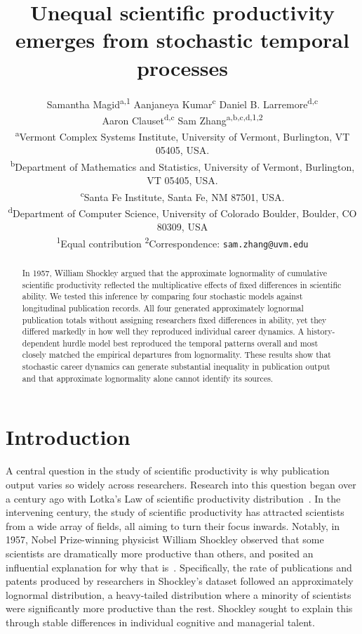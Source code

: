 \documentclass{article}
\title{Unequal scientific productivity emerges from stochastic temporal processes}
\author{%
    Samantha Magid\textsuperscript{a,1} \quad
    Aanjaneya Kumar\textsuperscript{c} \quad
    Daniel B. Larremore\textsuperscript{d,c} \\
    Aaron Clauset\textsuperscript{d,c} \quad
    Sam Zhang\textsuperscript{a,b,c,d,1,2} \\[0.5em]
    \small\textsuperscript{a}Vermont Complex Systems Institute, University of Vermont, Burlington, VT 05405, USA. \\
    \small\textsuperscript{b}Department of Mathematics and Statistics, University of Vermont, Burlington, VT 05405, USA. \\
    \small\textsuperscript{c}Santa Fe Institute, Santa Fe, NM 87501, USA. \\
    \small\textsuperscript{d}Department of Computer Science, University of Colorado Boulder, Boulder, CO 80309, USA \\[0.4em]
    \small\textsuperscript{1}Equal contribution \quad
    \small\textsuperscript{2}Correspondence: \texttt{sam.zhang@uvm.edu}
}
\date{}
\begin{document}
\maketitle

\begin{abstract}
In 1957, William Shockley argued that the approximate lognormality of cumulative scientific productivity reflected the multiplicative effects of fixed differences in scientific ability. We tested this inference by comparing four stochastic models against longitudinal publication records. All four generated approximately lognormal publication totals without assigning researchers fixed differences in ability, yet they differed markedly in how well they reproduced individual career dynamics. A history-dependent hurdle model best reproduced the temporal patterns overall and most closely matched the empirical departures from lognormality. These results show that stochastic career dynamics can generate substantial inequality in publication output and that approximate lognormality alone cannot identify its sources.
\end{abstract}


\section{Introduction}
A central question in the study of scientific productivity is why publication output varies so widely across researchers. Research into this question began over a century ago with Lotka's Law of scientific productivity distribution~\cite{origins_of_productivity_frequency_law_lotka1926}. In the intervening century, the study of scientific productivity has attracted scientists from a wide array of fields, all aiming to turn their focus inwards. Notably, in 1957, Nobel Prize-winning physicist William Shockley observed that some scientists are dramatically more productive than others, and posited an influential explanation for why that is~\cite{product_of_factors_explains_lognormality_shockley1957}. Specifically, the rate of publications and patents produced by researchers in Shockley's dataset followed an approximately lognormal distribution, a heavy-tailed distribution where a minority of scientists were significantly more productive than the rest. Shockley sought to explain this through stable differences in individual cognitive and managerial talent.
\end{document}
